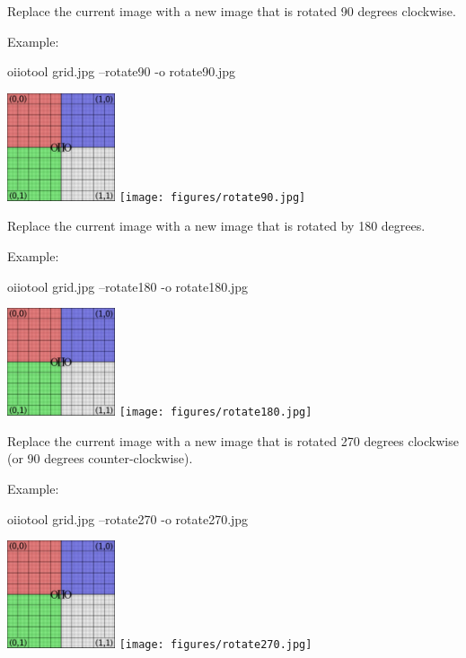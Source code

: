 \apiend

Replace the current image with a new image that is rotated 90 degrees
clockwise.

\noindent Example:
\begin{code}
    oiiotool grid.jpg --rotate90 -o rotate90.jpg
\end{code}
\spc \includegraphics[width=1.25in]{figures/grid-small.jpg}
\raisebox{40pt}{\large $\rightarrow$}
\texttt{[image: figures/rotate90.jpg]} \\
\apiend

Replace the current image with a new image that is rotated by
180 degrees.

\noindent Example:
\begin{code}
    oiiotool grid.jpg --rotate180 -o rotate180.jpg
\end{code}
\spc \includegraphics[width=1.25in]{figures/grid-small.jpg} 
\raisebox{40pt}{\large $\rightarrow$}
\texttt{[image: figures/rotate180.jpg]} \\
\apiend

Replace the current image with a new image that is rotated 270 degrees
clockwise (or 90 degrees counter-clockwise).

\noindent Example:
\begin{code}
    oiiotool grid.jpg --rotate270 -o rotate270.jpg
\end{code}
\spc \includegraphics[width=1.25in]{figures/grid-small.jpg}
\raisebox{40pt}{\large $\rightarrow$}
\texttt{[image: figures/rotate270.jpg]} \\
\apiend

